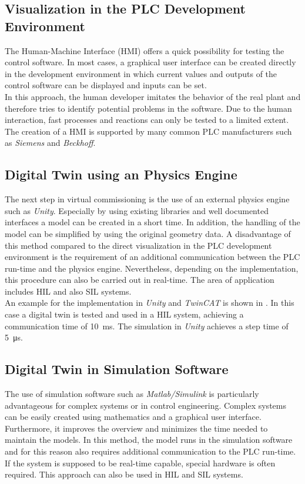 \subsection{Visualization in the PLC Development Environment}			%
	The Human-Machine Interface (HMI) offers a quick possibility for testing the control software. In most cases, a graphical user interface can be created directly in the development environment in which current values and outputs of the control software can be displayed and inputs can be set. \\
	In this approach, the human developer imitates the behavior of the real plant and therefore tries to identify potential problems in the software. Due to the human interaction, fast processes and reactions can only be tested to a limited extent. The creation of a HMI is supported by many common PLC manufacturers such as \textit{Siemens} and \textit{Beckhoff}.

\subsection{Digital Twin using an Physics Engine}		%
	The next step in virtual commissioning is the use of an external physics engine such as \textit{Unity}. Especially by using existing libraries and well documented interfaces a model can be created in a short time. In addition, the handling of the model can be simplified by using the original geometry data. A disadvantage of this method compared to the direct visualization in the PLC development environment is the requirement of an additional communication between the PLC run-time and the physics engine. Nevertheless, depending on the implementation, this procedure can also be carried out in real-time. The area of application includes HIL and also SIL systems. \\
	
	An example for the implementation in \textit{Unity} and \textit{TwinCAT} is shown in \cite{DigitalTwinUnityExample}. In this case a digital twin is tested and used in a HIL system, achieving a communication time of \SI{10}{\milli\second}. The simulation in \textit{Unity} achieves a step time of \SI{5}{\micro\second}.



\subsection{Digital Twin in Simulation Software}		%
	The use of simulation software such as \textit{Matlab/Simulink} is particularly advantageous for complex systems or in control engineering. Complex systems can be easily created using mathematics and a graphical user interface. Furthermore, it improves the overview and minimizes the time needed to maintain the models. In this method, the model runs in the simulation software and for this reason also requires additional communication to the PLC run-time. If the system is supposed to be real-time capable, special hardware is often required. This approach can also be used in HIL and SIL systems.

